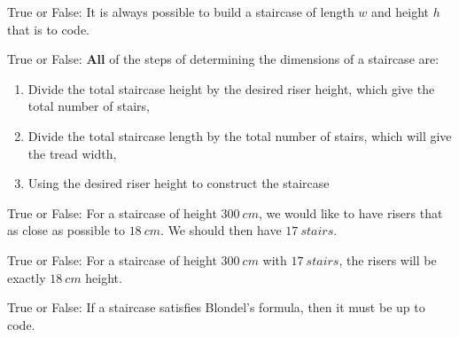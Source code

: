 \documentclass{ximera}
\author{Claire Merriman}
\begin{document}
\maketitle



\begin{exercise}
  True or False: It is always possible to build a staircase of length $w$ and height $h$ that is to code. 
\end{exercise}


\begin{exercise}
   True or False: \textbf{All} of the steps of determining the dimensions of a staircase are:
   
\begin{enumerate}
 \item Divide the total staircase height by the desired riser height, which give the total number of stairs,
 \item Divide the total staircase length by the total number of stairs, which will give the tread width,
 \item Using the desired riser height to construct the staircase
\end{enumerate}
\end{exercise}


\begin{exercise} True or False: 
 For a staircase of height $300\ cm$, we would like to have risers that as close as possible to $18\ cm$. We should then have $17\ stairs$.
\end{exercise}

\begin{exercise} True or False: 
 For a staircase of height $300\ cm$ with $17\ stairs$, the risers will be exactly $18\ cm$ height.
\end{exercise}

\begin{exercise} True or False: 
  If a staircase satisfies Blondel's formula, then it must be up to code.
\end{exercise}

\end{document}
